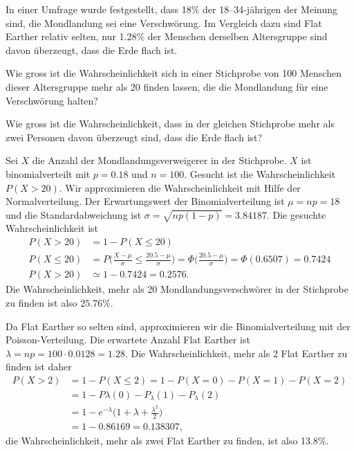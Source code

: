 In einer Umfrage wurde festgestellt, dass 18\% der 18--34-jährigen
der Meinung sind, die Mondlandung sei eine Verschwörung.
Im Vergleich dazu sind Flat Earther relativ selten, nur 1.28\%
der Menschen derselben Altersgruppe sind davon überzeugt, dass
die Erde flach ist.

\begin{teilaufgaben}
\item
Wie gross ist die Wahrscheinlichkeit sich in einer Stichprobe von
100 Menschen dieser Altersgruppe mehr als 20 finden lassen, die die
Mondlandung für eine Verschwörung halten?
\item
Wie gross ist die Wahrscheinlichkeit, dass in der gleichen Stichprobe
mehr als zwei Personen davon überzeugt sind, dass die Erde flach ist?
\end{teilaufgaben}

\begin{loesung}
\begin{teilaufgaben}
\item
Sei $X$ die Anzahl der Mondlandungsverweigerer in der Stichprobe.
$X$ ist binomialverteilt mit $p=0.18$ und $n=100$.
Gesucht ist die Wahrscheinlichkeit $P(X>20)$.
Wir approximieren die Wahrscheinlichkeit mit Hilfe der Normalverteilung.
Der Erwartungswert der Binomialverteilung ist $\mu=np=18$ und die
Standardabweichung ist $\sigma=\sqrt{np(1-p)}=3.84187$.
Die gesuchte Wahrscheinlichkeit ist
\begin{align*}
P(X>20)
&=
1-P(X\le 20)
\\
P(X\le 20)
&=
P\biggl( \frac{X-\mu}{\sigma} \le \frac{20.5-\mu}{\sigma}\biggr)
=
\Phi\biggl(\frac{20.5-\mu}{\sigma}\biggr)
=
\Phi(0.6507)
=
0.7424
\\
P(X>20)&\simeq 1-0.7424 = 0.2576.
\end{align*}
Die Wahrscheinlichkeit, mehr als 20 Mondlandungsverschwörer in der
Stichprobe zu finden ist also $25.76\%$.
\item
Da Flat Earther so selten sind, approximieren wir die Binomialverteilung
mit der Poisson-Verteilung.
Die erwartete Anzahl Flat Earther ist $\lambda = np = 100\cdot 0.0128=1.28$.
Die Wahrscheinlichkeit, mehr als 2 Flat Earther zu finden ist daher
\begin{align*}
P(X > 2)&=1-P(X\le 2) = 1-P(X=0) - P(X=1) - P(X=2)
\\
&=
1-P\lambda(0) -P_\lambda(1) -P_\lambda(2)
\\
&=
1-e^{-\lambda}\biggl(1 + \lambda + \frac{\lambda^2}{2}\biggr)
\\
&=
1- 0.86169 = 0.138307,
\end{align*}
die Wahrscheinlichkeit, mehr als zwei Flat Earther zu finden, ist also
13.8\%.
\qedhere
\end{teilaufgaben}
\end{loesung}

